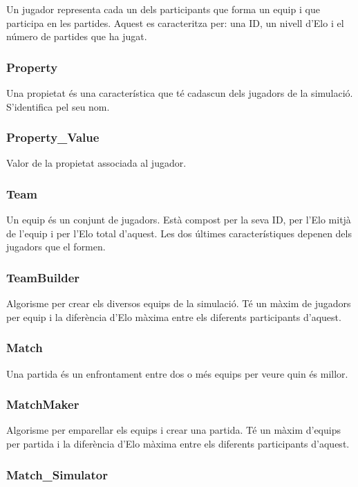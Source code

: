 \documentclass[a4paper]{article}
\begin{document}
Un jugador representa cada un dels participants que forma un equip i que participa en les partides. Aquest es caracteritza per: una ID, un nivell d'Elo i el número de partides que ha jugat.

\subsubsection*{Property}

Una propietat és una característica que té cadascun dels jugadors de la simulació. S'identifica pel seu nom.

\subsubsection*{Property\_Value}

Valor de la propietat associada al jugador.

\subsubsection*{Team}

Un equip és un conjunt de jugadors. Està compost per la seva ID, per l'Elo mitjà de l'equip i per l'Elo total d'aquest. Les dos últimes característiques depenen dels jugadors que el formen.

\subsubsection*{TeamBuilder}

Algorisme per crear els diversos equips de la simulació. Té un màxim de jugadors per equip i la diferència d'Elo màxima entre els diferents participants d'aquest.

\subsubsection*{Match}

Una partida és un enfrontament entre dos o més equips per veure quin és millor.

\subsubsection*{MatchMaker}

Algorisme per emparellar els equips i crear una partida. Té un màxim d'equips per partida i la diferència d'Elo màxima entre els diferents participants d'aquest.

\subsubsection*{Match\_Simulator}
\end{document}

